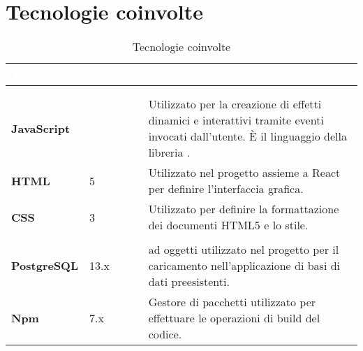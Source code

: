 \section{Tecnologie coinvolte}

{
\setlength\arrayrulewidth{0.95pt}
\renewcommand{\arraystretch}{1.5}
\begin{longtable}{C{3cm} | C{2cm} | C{10cm}}

\textcolor{white}{\textbf{Tecnologia}}&
\textcolor{white}{\textbf{Versione}}&
\textcolor{white}{\textbf{Descrizione}} \\
\endfirsthead
{}\\
\endfoot
{}\caption{Tecnologie coinvolte}
\endlastfoot
	
 \\

	\textbf{JavaScript} & 
	 &
	Utilizzato per la creazione di effetti dinamici e interattivi tramite eventi invocati dall'utente. È il linguaggio della libreria .\\

	\textbf{HTML} &
	5 &
	Utilizzato nel progetto assieme a React per definire l'interfaccia grafica. \\
	
	\textbf{CSS} &
	3 & 
	Utilizzato per definire la formattazione dei documenti HTML5 e lo stile. \\
	
 \\

	\textbf{PostgreSQL} & 
	13.x &
	 ad oggetti utilizzato nel progetto per il caricamento nell'applicazione di basi di dati preesistenti. \\
 
 	\textbf{Npm} & 
	7.x &
	Gestore di pacchetti utilizzato per effettuare le operazioni di build del codice. \\
 
 

\end{longtable}}
